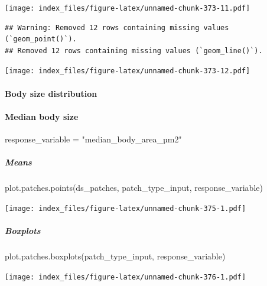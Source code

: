 \documentclass[
]{article}
\newenvironment{Shaded}{\begin{snugshade}}{\end{snugshade}}
\newcommand{\FunctionTok}[1]{\textcolor[rgb]{0.00,0.00,0.00}{#1}}
\newcommand{\NormalTok}[1]{#1}
\newcommand{\OtherTok}[1]{\textcolor[rgb]{0.56,0.35,0.01}{#1}}
\newcommand{\StringTok}[1]{\textcolor[rgb]{0.31,0.60,0.02}{#1}}
\begin{document}
\texttt{[image: index\_files/figure-latex/unnamed-chunk-373-11.pdf]}

\begin{verbatim}
## Warning: Removed 12 rows containing missing values (`geom_point()`).
## Removed 12 rows containing missing values (`geom_line()`).
\end{verbatim}

\texttt{[image: index\_files/figure-latex/unnamed-chunk-373-12.pdf]}

\hypertarget{body-size-distribution-2}{%
\paragraph{Body size distribution}\label{body-size-distribution-2}}

\hypertarget{median-body-size-2}{%
\paragraph{Median body size}\label{median-body-size-2}}

\begin{Shaded}
\begin{Highlighting}[]
\NormalTok{response\_variable }\OtherTok{=} \StringTok{"median\_body\_area\_µm2"}
\end{Highlighting}
\end{Shaded}

\hypertarget{means-36}{%
\subparagraph{Means}\label{means-36}}

\begin{Shaded}
\begin{Highlighting}[]
\FunctionTok{plot.patches.points}\NormalTok{(ds\_patches, patch\_type\_input,}
\NormalTok{                       response\_variable)}
\end{Highlighting}
\end{Shaded}

\texttt{[image: index\_files/figure-latex/unnamed-chunk-375-1.pdf]}

\hypertarget{boxplots-33}{%
\subparagraph{Boxplots}\label{boxplots-33}}

\begin{Shaded}
\begin{Highlighting}[]
\FunctionTok{plot.patches.boxplots}\NormalTok{(patch\_type\_input,}
\NormalTok{                       response\_variable)}
\end{Highlighting}
\end{Shaded}

\texttt{[image: index\_files/figure-latex/unnamed-chunk-376-1.pdf]}
\end{document}
